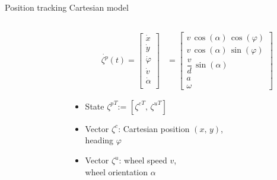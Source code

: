 \documentclass[10pt,aspectratio=1610]{beamer} %
\begin{document}
\begin{frame}{Position tracking Cartesian model}
	\begin{columns}[onlytextwidth]
		\begin{column}{0.5\textwidth}
			\begin{center}
			\def\svgwidth{1.0\textwidth}
			
			\end{center}
		\end{column}
		\begin{column}{0.5\textwidth}
			\begin{align*}
				\dot{\zeta^{p}}(t) = \begin{bmatrix}
					\dot{x}\\
					\dot{y}\\
					\dot{\varphi}\\
					\dot{v}\\
					\dot{\alpha}\\
				\end{bmatrix} & = 
				\begin{bmatrix}
					v\, \cos(\alpha)\, \cos(\varphi)\\
					v\, \cos(\alpha)\, \sin(\varphi)\\
					\dfrac{v}{d}\, \sin(\alpha)\\
					a\\
					\omega 
				\end{bmatrix}
			\end{align*}
		
		\begin{itemize}[label=\textbullet]
			\item State ${\zeta^{p}}^T$:= $[{\zeta^{c}}^T,\,{\zeta^{u}}^T]$
			\item Vector $\zeta^{c}$: Cartesian position $(x,\, y)$,\\
			\hspace{0.62in} heading $\varphi$
			\item Vector $\zeta^{u}$: wheel speed $v$,\\ 
			\hspace{0.62in} wheel orientation $\alpha$
		\end{itemize}
		\end{column}
	\end{columns}
\end{frame}
\end{document}
